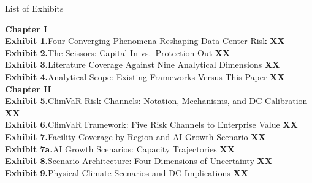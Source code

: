 \clearpage\thispagestyle{chapterstart}

\vspace*{-5mm}
{\displayfont\fontsize{28}{32}\selectfont\color{SEGreen}List of Exhibits\par}
\vspace{6mm}

{\fontsize{9}{13}\selectfont

\noindent\textbf{\color{SEGreen}Chapter I}\\[4pt]
\noindent\textbf{\color{SEGreen}Exhibit 1.}\enspace Four Converging Phenomena Reshaping Data Center Risk \dotfill \textbf{XX}\\[3pt]
\noindent\textbf{\color{SEGreen}Exhibit 2.}\enspace The Scissors: Capital In vs.\ Protection Out \dotfill \textbf{XX}\\[3pt]
\noindent\textbf{\color{SEGreen}Exhibit 3.}\enspace Literature Coverage Against Nine Analytical Dimensions \dotfill \textbf{XX}\\[3pt]
\noindent\textbf{\color{SEGreen}Exhibit 4.}\enspace Analytical Scope: Existing Frameworks Versus This Paper \dotfill \textbf{XX}\\[8pt]

\noindent\textbf{\color{SEGreen}Chapter II}\\[4pt]
\noindent\textbf{\color{SEGreen}Exhibit 5.}\enspace ClimVaR Risk Channels: Notation, Mechanisms, and DC Calibration \dotfill \textbf{XX}\\[3pt]
\noindent\textbf{\color{SEGreen}Exhibit 6.}\enspace ClimVaR Framework: Five Risk Channels to Enterprise Value \dotfill \textbf{XX}\\[3pt]
\noindent\textbf{\color{SEGreen}Exhibit 7.}\enspace Facility Coverage by Region and AI Growth Scenario \dotfill \textbf{XX}\\[3pt]
\noindent\textbf{\color{SEGreen}Exhibit 7a.}\enspace AI Growth Scenarios: Capacity Trajectories \dotfill \textbf{XX}\\[3pt]
\noindent\textbf{\color{SEGreen}Exhibit 8.}\enspace Scenario Architecture: Four Dimensions of Uncertainty \dotfill \textbf{XX}\\[3pt]
\noindent\textbf{\color{SEGreen}Exhibit 9.}\enspace Physical Climate Scenarios and DC Implications \dotfill \textbf{XX}\\[8pt]

}

